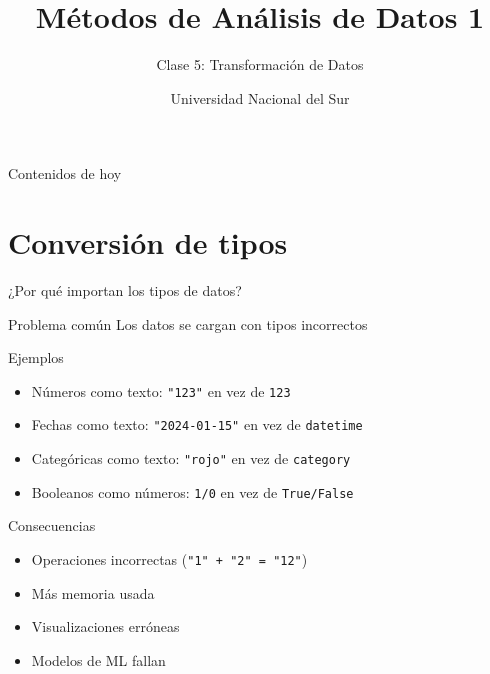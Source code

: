 \documentclass[aspectratio=169]{beamer}
\title{Métodos de Análisis de Datos 1}
\subtitle{Clase 5: Transformación de Datos}
\author{Universidad Nacional del Sur}
\date{}
\begin{document}
\begin{frame}
\titlepage
\end{frame}

\begin{frame}{Contenidos de hoy}
\tableofcontents
\end{frame}

\section{Conversión de tipos}

\begin{frame}{¿Por qué importan los tipos de datos?}
\begin{alertblock}{Problema común}
Los datos se cargan con tipos incorrectos
\end{alertblock}

\begin{exampleblock}{Ejemplos}
\begin{itemize}
    \item Números como texto: \texttt{"123"} en vez de \texttt{123}
    \item Fechas como texto: \texttt{"2024-01-15"} en vez de \texttt{datetime}
    \item Categóricas como texto: \texttt{"rojo"} en vez de \texttt{category}
    \item Booleanos como números: \texttt{1/0} en vez de \texttt{True/False}
\end{itemize}
\end{exampleblock}

\pause

\begin{block}{Consecuencias}
\begin{itemize}
    \item Operaciones incorrectas (\texttt{"1" + "2" = "12"})
    \item Más memoria usada
    \item Visualizaciones erróneas
    \item Modelos de ML fallan
\end{itemize}
\end{block}
\end{frame}
\end{document}
